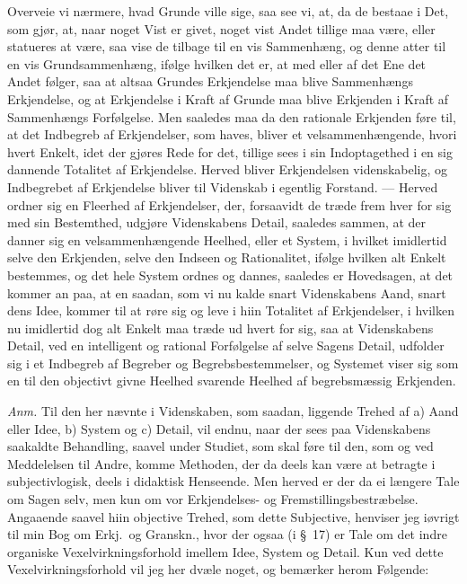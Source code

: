 \documentclass[12pt,a4paper]{book}
\newcommand{\apage}[1]{\marginnote{\footnotesize\textit{[#1]}}}
\begin{document}
Overveie vi nærmere, hvad Grunde ville sige, saa see vi, at, da de bestaae i Det,
som gjør, at, naar noget Vist er givet, noget vist Andet tillige maa være, eller
statueres at være, saa vise de tilbage til en vis Sammenhæng, og denne atter til
en vis Grundsammenhæng, ifølge hvilken det er, at med eller af det Ene det Andet
følger, saa at altsaa Grundes Erkjendelse maa blive Sammenhængs Erkjendelse, og
at Erkjendelse i Kraft af Grunde maa blive Erkjenden i Kraft af Sammenhængs
Forfølgelse. Men saaledes maa da den rationale Erkjenden føre til, at det
Indbegreb af Erkjendelser, som haves, bliver et velsammenhængende, hvori hvert
Enkelt, idet der gjøres Rede for det, tillige sees i sin Indoptagethed i en sig
dannende Totalitet af Erkjendelse. Herved bliver Erkjendelsen videnskabelig, og
Indbegrebet af Erkjendelse bliver til Videnskab i egentlig Forstand. --- Herved
ordner sig en Fleerhed af Erkjendelser, der, forsaavidt de træde frem hver for
sig med sin Bestemthed, udgjøre Videnskabens Detail, saaledes sammen, at der
danner sig en velsammenhængende Heelhed, eller et System, i hvilket imidlertid
selve den Erkjenden, selve den Indseen og Rationalitet, ifølge hvilken alt Enkelt
bestemmes, og det hele System ordnes og dannes, saaledes er Hovedsagen, at det
kommer an paa, at en saadan, som vi nu kalde snart Videnskabens Aand, snart dens
Idee, kommer til at røre sig og leve i hiin Totalitet af Erkjendelser, i hvilken
nu imidlertid dog alt Enkelt maa træde ud hvert for sig, saa at Videnskabens
Detail, ved en intelligent og rational Forfølgelse af selve Sagens Detail,  \apage{23}
udfolder sig i et Indbegreb af Begreber og Begrebsbestemmelser, og Systemet viser
sig som en til den objectivt givne Heelhed svarende Heelhed af begrebsmæssig
Erkjenden.

{\small\emph{Anm.} Til den her nævnte i Videnskaben, som saadan, liggende Trehed
af a) Aand eller Idee, b) System og c) Detail, vil endnu, naar der sees paa
Videnskabens saakaldte Behandling, saavel under Studiet, som skal føre til den,
som og ved Meddelelsen til Andre, komme Methoden, der da deels kan være at
betragte i subjectivlogisk, deels i didaktisk Henseende. Men herved er der da ei
længere Tale om Sagen selv, men kun om vor Erkjendelses- og
Fremstillingsbestræbelse. Angaaende saavel hiin objective Trehed, som dette
Subjective, henviser jeg iøvrigt til min Bog om Erkj.\ og Granskn., hvor der
ogsaa (i \S~17) er Tale om det indre organiske Vexelvirkningsforhold imellem
Idee, System og Detail. Kun ved dette Vexelvirkningsforhold vil jeg her dvæle
noget, og bemærker herom Følgende:\par}
\end{document}
